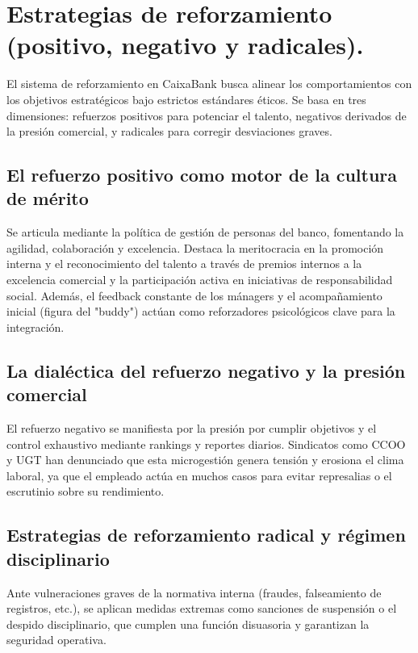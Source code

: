 \section{Estrategias de reforzamiento (positivo, negativo y radicales).}

El sistema de reforzamiento en CaixaBank busca alinear los comportamientos con los objetivos estratégicos bajo estrictos estándares éticos. Se basa en tres dimensiones: refuerzos positivos para potenciar el talento, negativos derivados de la presión comercial, y radicales para corregir desviaciones graves.

\subsection{El refuerzo positivo como motor de la cultura de mérito}
Se articula mediante la política de gestión de personas del banco, fomentando la agilidad, colaboración y excelencia. Destaca la meritocracia en la promoción interna y el reconocimiento del talento a través de premios internos a la excelencia comercial y la participación activa en iniciativas de responsabilidad social. Además, el feedback constante de los mánagers y el acompañamiento inicial (figura del "buddy") actúan como reforzadores psicológicos clave para la integración.

\subsection{La dialéctica del refuerzo negativo y la presión comercial}
El refuerzo negativo se manifiesta por la presión por cumplir objetivos y el control exhaustivo mediante rankings y reportes diarios. Sindicatos como CCOO y UGT han denunciado que esta microgestión genera tensión y erosiona el clima laboral, ya que el empleado actúa en muchos casos para evitar represalias o el escrutinio sobre su rendimiento.

\subsection{Estrategias de reforzamiento radical y régimen disciplinario}
Ante vulneraciones graves de la normativa interna (fraudes, falseamiento de registros, etc.), se aplican medidas extremas como sanciones de suspensión o el despido disciplinario, que cumplen una función disuasoria y garantizan la seguridad operativa.

